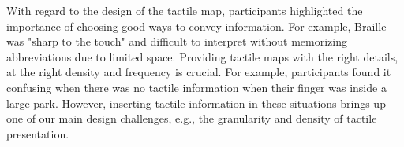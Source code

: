 With regard to the design of the tactile map, participants highlighted the importance of choosing good ways to convey information. For example, Braille was "sharp to the touch" and difficult to interpret without memorizing abbreviations due to limited space. Providing tactile maps with the right details, at the right density and frequency is crucial. For example, participants found it confusing when there was no tactile information when their finger was inside a large park. However, inserting tactile information in these situations brings up one of our main design challenges, e.g., the granularity and density of tactile presentation.








